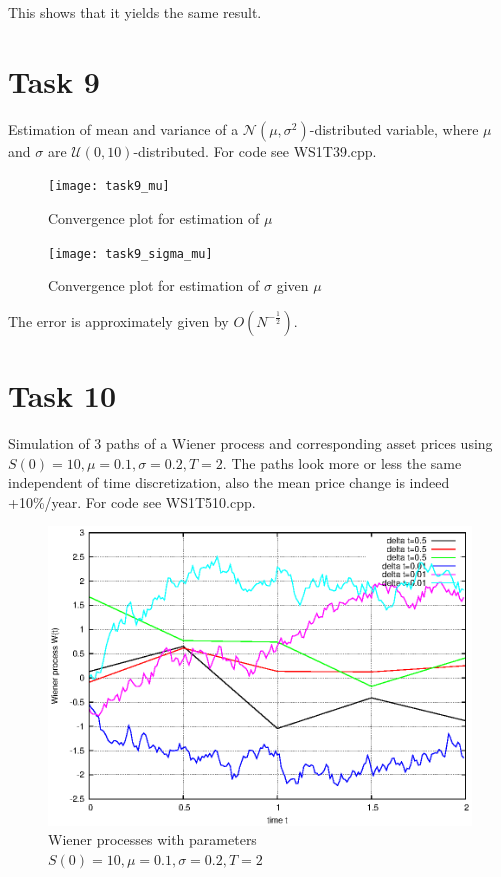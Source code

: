 \documentclass[]{article}
\begin{document}
This shows that it yields the same result.
\clearpage
\section*{Task 9}
Estimation of mean and variance of a $\mathcal{N}(\mu,\sigma^2)$-distributed variable, where $\mu$ and $\sigma$ are $\mathcal{U}(0,10)$-distributed. For code see WS1T39.cpp.\\
\begin{figure}[!ht]
\centering
\texttt{[image: task9\_mu]}
\caption{Convergence plot for estimation of $\mu$}
\label{fig:Task9a}
\end{figure}

\begin{figure}[!ht]
\centering
\texttt{[image: task9\_sigma\_mu]}
\caption{Convergence plot for estimation of $\sigma$ given $\mu$}
\label{fig:Task9b}
\end{figure}

The error is approximately given by $O(N^{-\frac{1}{2}})$.

\newpage
\section*{Task 10} Simulation of 3 paths of a Wiener process and corresponding asset prices using $S(0)=10,\mu=0.1,\sigma=0.2,T=2$. The paths look more or less the same independent of time discretization, also the mean price change is indeed +10\%/year. For code see WS1T510.cpp.\\


\begin{figure}[!ht]
\centering
\includegraphics{task10_w}
\caption{Wiener processes with parameters $S(0)=10,\mu=0.1,\sigma=0.2,T=2$}
\label{fig:Task10a}
\end{figure}
\end{document}
